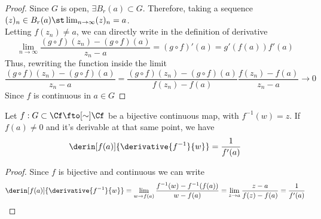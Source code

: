 \documentclass[../mmf.tex]{subfiles}
\begin{document}
\begin{proof}
	Since $G$ is open, $\exists B_r(a)\subset G$. Therefore, taking a sequence $(z)_n\in B_r(a)\st\lim_{n\to\infty}(z)_n=a$.\\
	Letting $f(z_n)\ne a$, we can directly write in the definition of derivative
	\begin{equation*}
		\lim_{n\to\infty}\frac{(g\circ f)(z_n)-(g\circ f)(a)}{z_n-a}=(g\circ f)'(a)=g'(f(a))f'(a)
	\end{equation*}
	Thus, rewriting the function inside the limit
	\begin{equation*}
		\frac{(g\circ f)(z_n)-(g\circ f)(a)}{z_n-a}=\frac{(g\circ f)(z_n)-(g\circ f)(a)}{f(z_n)-f(a)}\frac{f(z_n)-f(a)}{z_n-a}\to0
	\end{equation*}
	Since $f$ is continuous in $a\in G$
\end{proof}
\begin{thm}
	Let $f:G\subset\Cf\fto[\sim]\Cf$ be a bijective continuous map, with $f^{-1}(w)=z$. If $f(a)\ne0$ and it's derivable at that same point, we have
	\begin{equation}
		\derin[f(a)]{\derivative{f^{-1}}{w}}=\frac{1}{f'(a)}
		\label{eq:inversedercf}
	\end{equation}
\end{thm}
\begin{proof}
	Since $f$ is bijective and continuous we can write
	\begin{equation*}
		\derin[f(a)]{\derivative{f^{-1}}{w}}=\lim_{w\to f(a)}\frac{f^{-1}(w)-f^{-1}(f(a))}{w-f(a)}=\lim_{z\to a}\frac{z-a}{f(z)-f(a)}=\frac{1}{f'(a)}
	\end{equation*}
\end{proof}
\end{document}
